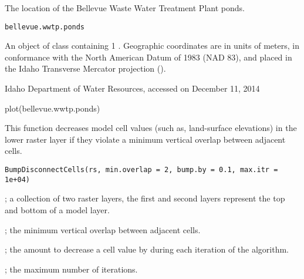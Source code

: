 \documentclass[a4paper]{book}
\begin{document}
%
\begin{Description}\relax
The location of the Bellevue Waste Water Treatment Plant ponds.
\end{Description}
%
\begin{Usage}
\begin{verbatim}
bellevue.wwtp.ponds
\end{verbatim}
\end{Usage}
%
\begin{Format}
An object of  class containing 1 .
Geographic coordinates are in units of meters, in conformance with the North American Datum of 1983 (NAD 83), and placed in the
Idaho Transverse Mercator projection ().
\end{Format}
%
\begin{Source}\relax
Idaho Department of Water Resources, accessed on December 11, 2014
\end{Source}
%
\begin{Examples}
\begin{ExampleCode}
plot(bellevue.wwtp.ponds)
\end{ExampleCode}
\end{Examples}
%
\begin{Description}\relax
This function decreases model cell values (such as, land-surface elevations) in the lower raster layer if they violate a minimum vertical overlap between adjacent cells.
\end{Description}
%
\begin{Usage}
\begin{verbatim}
BumpDisconnectCells(rs, min.overlap = 2, bump.by = 0.1, max.itr = 1e+04)
\end{verbatim}
\end{Usage}
%
\begin{Arguments}
\begin{ldescription}
\item[\code{rs}] ; a collection of two raster layers, the first and second layers represent the top and bottom of a model layer.
\item[\code{min.overlap}] ; the minimum vertical overlap between adjacent cells.
\item[\code{bump.by}] ; the amount to decrease a cell value by during each iteration of the algorithm.
\item[\code{max.itr}] ; the maximum number of iterations.
\end{ldescription}
\end{Arguments}
\end{document}
